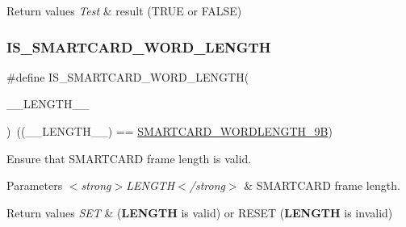 \begin{DoxyRetVals}{Return values}
{\em Test} & result (T\+R\+UE or F\+A\+L\+SE) \\
\hline
\end{DoxyRetVals}
\mbox{\label{group___s_m_a_r_t_c_a_r_d___private___macros_ga7db1a0183bc5e4803fc2f72e636dbff5}} 
\subsubsection{\texorpdfstring{I\+S\+\_\+\+S\+M\+A\+R\+T\+C\+A\+R\+D\+\_\+\+W\+O\+R\+D\+\_\+\+L\+E\+N\+G\+TH}{IS\_SMARTCARD\_WORD\_LENGTH}}
{\footnotesize\ttfamily \#define I\+S\+\_\+\+S\+M\+A\+R\+T\+C\+A\+R\+D\+\_\+\+W\+O\+R\+D\+\_\+\+L\+E\+N\+G\+TH(\begin{DoxyParamCaption}\item[{}]{\+\_\+\+\_\+\+L\+E\+N\+G\+T\+H\+\_\+\+\_\+ }\end{DoxyParamCaption})~((\+\_\+\+\_\+\+L\+E\+N\+G\+T\+H\+\_\+\+\_\+) == \hyperlink{group___s_m_a_r_t_c_a_r_d___word___length_ga22f73d114cf13ee0041537303faef14b}{S\+M\+A\+R\+T\+C\+A\+R\+D\+\_\+\+W\+O\+R\+D\+L\+E\+N\+G\+T\+H\+\_\+9B})}



Ensure that S\+M\+A\+R\+T\+C\+A\+RD frame length is valid. 


\begin{DoxyParams}{Parameters}
{\em $<$strong$>$\+L\+E\+N\+G\+T\+H$<$/strong$>$} & S\+M\+A\+R\+T\+C\+A\+RD frame length. \\
\hline
\end{DoxyParams}

\begin{DoxyRetVals}{Return values}
{\em S\+ET} & ({\bfseries L\+E\+N\+G\+TH} is valid) or R\+E\+S\+ET ({\bfseries L\+E\+N\+G\+TH} is invalid) \\
\hline
\end{DoxyRetVals}
